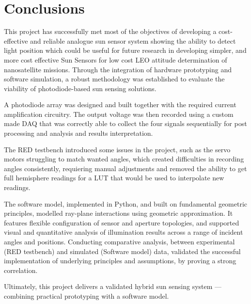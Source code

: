 \chapter{Conclusions}

This project has successfully met most of the objectives of developing a cost-effective and reliable analogue sun sensor system showing the ability to detect light position which could be useful for future research in developing simpler, and more cost effective Sun Sensors for low cost \acf{LEO} attitude determination of nanosatellite missions. Through the integration of hardware prototyping and software simulation, a robust methodology was established to evaluate the viability of photodiode-based sun sensing solutions.

A photodiode array was designed and built together with the required current amplification circuitry. The output voltage was then recorded using a custom made \ac{DAQ} that was correctly able to collect the four signals sequentially for post processing and analysis and results interpretation.


The \acf{RED} testbench introduced some issues in the project, such as the servo motors struggling to match wanted angles, which created difficulties in recording angles consistently, requiering manual adjustments and removed the ability to get full hemisphere readings for a \ac{LUT} that would be used to interpolate new readings.

The software model, implemented in Python, and built on fundamental geometric principles, modelled ray-plane interactions using geometric approximation.  It features flexible configuration of sensor and aperture topologies, and supported visual and quantitative analysis of illumination results across a range of incident angles and positions. Conducting comparative analysis, between experimental (RED testbench) and simulated (Software model) data, validated the successful implementation of underlying principles and assumptions, by proving a strong correlation.

Ultimately, this project delivers a validated hybrid sun sensing system — combining practical prototyping with a software model.
